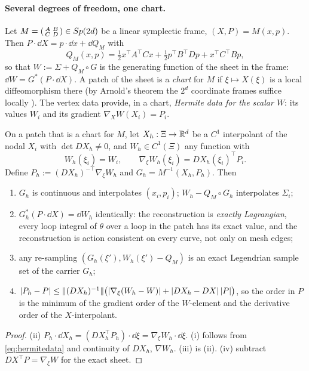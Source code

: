 \paragraph{Several degrees of freedom, one chart.}
Let $M=\begin{psmallmatrix}A&B\\ C&D\end{psmallmatrix}\in Sp(2d)$ be a linear symplectic frame, $(X,P)=M(x,p)$.
Then $P\cdot\dd X=p\cdot\dd x+\dd Q_M$ with
\begin{equation}\label{eq:QM}
Q_M(x,p)=\tfrac12x^{\!\top}A^{\!\top}Cx+\tfrac12p^{\!\top}B^{\!\top}Dp+x^{\!\top}C^{\!\top}Bp ,
\end{equation}
so that $W:=\Sigma+Q_M\circ G$ is the generating function of the sheet in the frame: $\dd W=G^*(P\cdot\dd X)$. A patch
of the sheet is a \emph{chart} for $M$ if $\xi\mapsto X(\xi)$ is a local diffeomorphism there (by Arnold's theorem
the $2^d$ coordinate frames suffice locally \cite{Arnold}). The vertex data provide, in a chart, \emph{Hermite data
for the scalar $W$}: its values $W_i$ and its gradient $\nabla_XW(X_i)=P_i$.

\begin{theorem}\label{thm:front}
On a patch that is a chart for $M$, let $X_h:\Xi\to\mathbb{R}^d$ be a $C^1$ interpolant of the nodal $X_i$ with
$\det DX_h\neq0$, and $W_h\in C^1(\Xi)$ any function with
\begin{equation}\label{eq:hermitedata}
W_h(\xi_i)=W_i,\qquad\nabla_\xi W_h(\xi_i)=DX_h(\xi_i)^{\!\top}P_i .
\end{equation}
Define $P_h:=(DX_h)^{-\top}\nabla_\xi W_h$ and $G_h=M^{-1}(X_h,P_h)$. Then
\begin{enumerate}[label=(\roman*),leftmargin=2.2em,itemsep=1pt]
\item $G_h$ is continuous and interpolates $(x_i,p_i)$; $W_h-Q_M\circ G_h$ interpolates $\Sigma_i$;
\item $G_h^*(P\cdot\dd X)=\dd W_h$ identically: the reconstruction is \emph{exactly Lagrangian}, every loop integral
of $\theta$ over a loop in the patch has its exact value, and the reconstruction is action consistent on every
curve, not only on mesh edges;
\item any re-sampling $(G_h(\xi'),W_h(\xi')-Q_M)$ is an exact Legendrian sample set of the carrier $G_h$;
\item $\lvert P_h-P\rvert\le\lVert (DX_h)^{-1}\rVert\big(\lvert \nabla_\xi(W_h-W)\rvert+\lvert DX_h-DX\rvert\,\lvert P\rvert\big)$, so the order in $P$ is
the minimum of the gradient order of the $W$-element and the derivative order of the $X$-interpolant.
\end{enumerate}
\end{theorem}
\begin{proof}
(ii) $P_h\cdot\dd X_h=(DX_h^{\!\top}P_h)\cdot\dd\xi=\nabla_\xi W_h\cdot\dd\xi$. (i) follows from \eqref{eq:hermitedata} and
continuity of $DX_h$, $\nabla W_h$. (iii) is (ii). (iv) subtract $DX^{\!\top}P=\nabla_\xi W$ for the exact sheet.
\end{proof}

